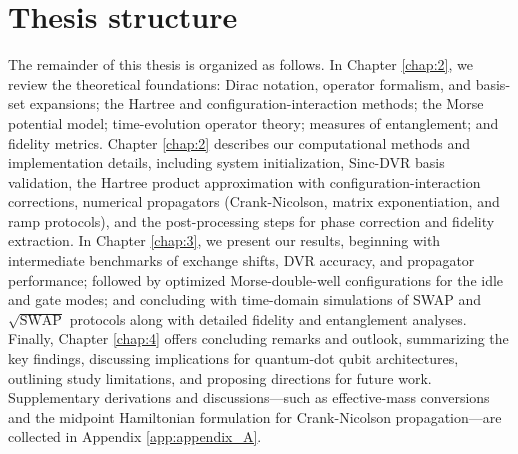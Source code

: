 \documentclass{subfiles}
\begin{document}
\section{Thesis structure}
The remainder of this thesis is organized as follows. In Chapter \ref{chap:2}, we review the theoretical foundations: Dirac notation, operator formalism, and basis-set expansions; the Hartree and configuration-interaction methods; the Morse potential model; time-evolution operator theory; measures of entanglement; and fidelity metrics. Chapter \ref{chap:2} describes our computational methods and implementation details, including system initialization, Sinc-DVR basis validation, the Hartree product approximation with configuration-interaction corrections, numerical propagators (Crank-Nicolson, matrix exponentiation, and ramp protocols), and the post-processing steps for phase correction and fidelity extraction. In Chapter \ref{chap:3}, we present our results, beginning with intermediate benchmarks of exchange shifts, DVR accuracy, and propagator performance; followed by optimized Morse-double-well configurations for the idle and gate modes; and concluding with time-domain simulations of SWAP and $\sqrt{\mathrm{SWAP}}$ protocols along with detailed fidelity and entanglement analyses. Finally, Chapter \ref{chap:4} offers concluding remarks and outlook, summarizing the key findings, discussing implications for quantum-dot qubit architectures, outlining study limitations, and proposing directions for future work. Supplementary derivations and discussions—such as effective-mass conversions and the midpoint Hamiltonian formulation for Crank-Nicolson propagation—are collected in Appendix \ref{app:appendix_A}.
\end{document}
